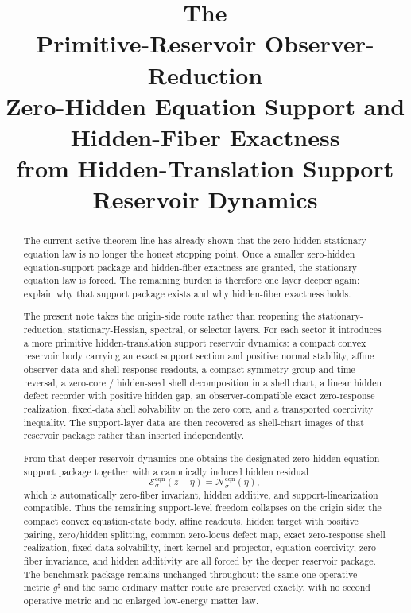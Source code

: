 \documentclass[11pt]{article}
\title{\textbf{The \TheoryName{}}\\[0.4em]
\large Primitive-Reservoir Observer-Reduction\\
\large Zero-Hidden Equation Support and Hidden-Fiber Exactness\\
\large from Hidden-Translation Support Reservoir Dynamics}
\author{}
\date{}
\newcommand{\CompletedMetric}{g^{\sharp}}
\newcommand{\EqnResidual}[1]{\mathcal E_{#1}^{\mathrm{eqn}}}
\newcommand{\EqnLin}[1]{\mathcal N_{#1}^{\mathrm{eqn}}}
\begin{document}
\maketitle

\begin{abstract}
The current active theorem line has already shown that the zero-hidden stationary equation law is no longer the honest stopping point. Once a smaller zero-hidden equation-support package and hidden-fiber exactness are granted, the stationary equation law is forced. The remaining burden is therefore one layer deeper again: explain why that support package exists and why hidden-fiber exactness holds.

The present note takes the origin-side route rather than reopening the stationary-reduction, stationary-Hessian, spectral, or selector layers. For each sector it introduces a more primitive hidden-translation support reservoir dynamics: a compact convex reservoir body carrying an exact support section and positive normal stability, affine observer-data and shell-response readouts, a compact symmetry group and time reversal, a zero-core / hidden-seed shell decomposition in a shell chart, a linear hidden defect recorder with positive hidden gap, an observer-compatible exact zero-response realization, fixed-data shell solvability on the zero core, and a transported coercivity inequality. The support-layer data are then recovered as shell-chart images of that reservoir package rather than inserted independently.

From that deeper reservoir dynamics one obtains the designated zero-hidden equation-support package together with a canonically induced hidden residual
\[
\EqnResidual{\sigma}(z+\eta)=\EqnLin{\sigma}(\eta),
\]
which is automatically zero-fiber invariant, hidden additive, and support-linearization compatible. Thus the remaining support-level freedom collapses on the origin side: the compact convex equation-state body, affine readouts, hidden target with positive pairing, zero/hidden splitting, common zero-locus defect map, exact zero-response shell realization, fixed-data solvability, inert kernel and projector, equation coercivity, zero-fiber invariance, and hidden additivity are all forced by the deeper reservoir package. The benchmark package remains unchanged throughout: the same one operative metric \(\CompletedMetric\) and the same ordinary matter route are preserved exactly, with no second operative metric and no enlarged low-energy matter law.
\end{abstract}
\end{document}
